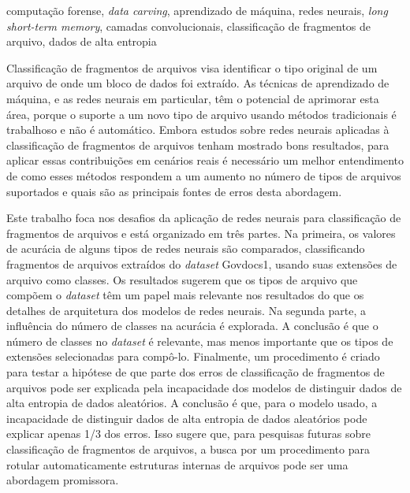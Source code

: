 \begin{resumo}{computação forense, \textit{data carving}, aprendizado de máquina, redes neurais, \textit{long short-term memory}, camadas convolucionais, classificação de fragmentos de arquivo, dados de alta entropia}

Classificação de fragmentos de arquivos visa identificar o tipo original de um arquivo de onde um bloco de dados foi extraído. As técnicas de aprendizado de máquina, e as redes neurais em particular, têm o potencial de aprimorar esta área, porque o suporte a um novo tipo de arquivo usando métodos tradicionais é trabalhoso e não é automático. Embora estudos sobre redes neurais aplicadas à classificação de fragmentos de arquivos tenham mostrado bons resultados, para aplicar essas contribuições em cenários reais é necessário um melhor entendimento de como esses métodos respondem a um aumento no número de tipos de arquivos suportados e quais são as principais fontes de erros desta abordagem.

Este trabalho foca nos desafios da aplicação de redes neurais para classificação de fragmentos de arquivos e está organizado em três partes.
Na primeira, os valores de acurácia de alguns tipos de redes neurais são comparados, classificando fragmentos de arquivos extraídos do \textit{dataset} Govdocs1, usando suas extensões de arquivo como classes.
Os resultados sugerem que os tipos de arquivo que compõem o \textit{dataset} têm um papel mais relevante nos resultados do que os detalhes de arquitetura dos modelos de redes neurais.
Na segunda parte, a influência do número de classes na acurácia é explorada.
A conclusão é que o número de classes no \textit{dataset} é relevante, mas menos importante que os tipos de extensões selecionadas para compô-lo.
Finalmente, um procedimento é criado para testar a hipótese de que parte dos erros de classificação de fragmentos de arquivos pode ser explicada pela incapacidade dos modelos de distinguir dados de alta entropia de dados aleatórios.
A conclusão é que, para o modelo usado, a incapacidade de distinguir dados de alta entropia de dados aleatórios pode explicar apenas 1/3 dos erros.
Isso sugere que, para pesquisas futuras sobre classificação de fragmentos de arquivos, a busca por um procedimento para rotular automaticamente estruturas internas de arquivos pode ser uma abordagem promissora.

\end{resumo}



